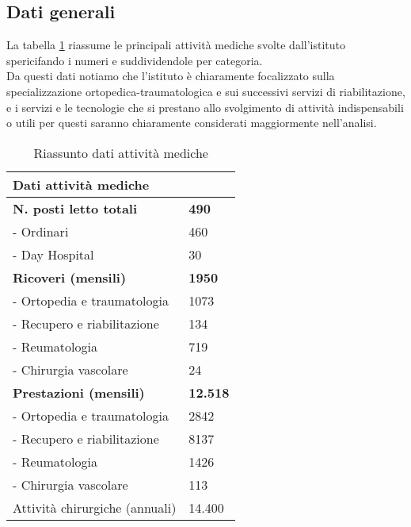 	\subsection{Dati generali}
	La tabella \ref{tab:attivitaMediche} riassume le principali attività mediche svolte dall'istituto spericifando i numeri e suddividendole per categoria. \\
	Da questi dati notiamo che l’istituto è chiaramente focalizzato sulla specializzazione ortopedica-traumatologica e sui successivi servizi di riabilitazione, e i servizi e le tecnologie che si prestano allo svolgimento di attività indispensabili o utili per questi saranno chiaramente considerati maggiormente nell'analisi. \\
	\begin{table}[h] 
		\centering
		\begin{tabular}{|l|l|}
			\hline
			\rowcolor[HTML]{EFEFEF} 
			\textbf{Dati attività mediche} & \\ \hline
			\textbf{N. posti letto totali}					& \textbf{490} \\
			- Ordinari 							& 460 \\
			- Day Hospital 					& 30 	\\ \hline
			\textbf{Ricoveri (mensili)}  				& \textbf{1950}			\\
			- Ortopedia e traumatologia   & 1073 \\
			- Recupero e riabilitazione 	& 134 \\
			- Reumatologia 						& 719 \\
			- Chirurgia vascolare  				& 24 \\ \hline
			\textbf{Prestazioni (mensili)}	  			& \textbf{12.518}		\\
			- Ortopedia e traumatologia   & 2842 \\
			- Recupero e riabilitazione 	& 8137 \\
			- Reumatologia 						& 1426 \\
			- Chirurgia vascolare  				& 113 \\ \hline
			Attività chirurgiche (annuali)  & 14.400		\\ \hline
		\end{tabular}
	\caption{Riassunto dati attività mediche}\label{tab:attivitaMediche}
	\end{table}
	\\ \\
	
	
	
